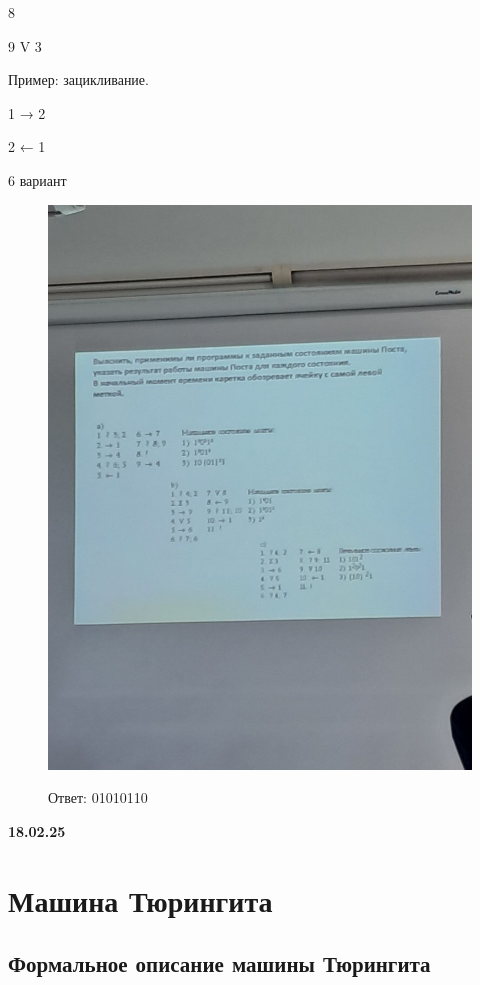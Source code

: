\documentclass{article}
\begin{document}
8 

9 V 3


Пример: зацикливание. 

1 → 2

2 ← 1


6 вариант 
\begin{figure}
    \centering
    \includegraphics[width=1\linewidth]{photo_5285451810783490009_y.jpg}

Ответ: 01010110
    
\end{figure}

\vspace{10mm}

\textbf{18.02.25}

\section{Машина Тюрингита}

\subsection{Формальное описание машины Тюрингита}
\end{document}
